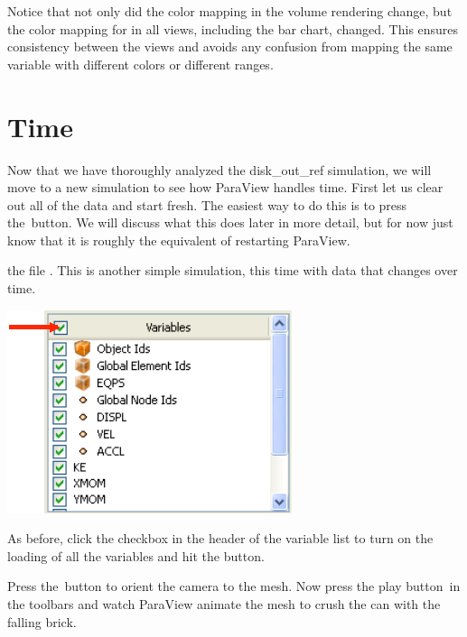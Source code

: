 Notice that not only did the color mapping in the volume rendering change,
but the color mapping for  in all views, including the bar chart,
changed.  This ensures consistency between the views and avoids any
confusion from mapping the same variable with different colors or different
ranges.


\section{Time}

Now that we have thoroughly analyzed the disk\_out\_ref simulation, we will
move to a new simulation to see how ParaView handles time.  First let us
clear out all of the data and start fresh.  The easiest way to do this is
to press the~\disconnect button.  We will discuss what this does later in more
detail, but for now just know that it is roughly the equivalent of
restarting ParaView.

 the file .  This is another simple simulation, this
time with data that changes over time.

\begin{inlinefig}
  \includegraphics{images/Variables_can}
\end{inlinefig}

As before, click the checkbox in the header of the variable list to turn on
the loading of all the variables and hit the \apply button.

Press the~\yPlus button to orient the camera to the mesh.  Now press the
play button~\vcrPlay in the toolbars and watch ParaView animate the mesh to
crush the can with the falling brick.

